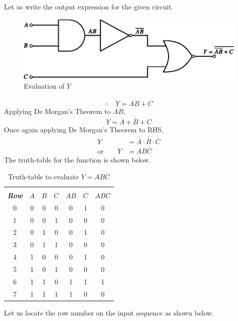 \begin{solution}
Let us write the output expression for the given circuit.
\begin{figure}[H]
\centering
\includegraphics{chap6/fig125.eps}
\medskip
\caption*{Evaluation of $Y$}
\end{figure}

\eject

$$
\therefore\quad Y=\overline{\overline{AB}+C}
$$
Applying De Morgan's Theorem to $\overline{AB}$,
$$
Y=\overline{\overline{A}+\overline{B}+C}
$$
Once again applying De Morgan's Theorem to RHS,
\begin{align*}
Y &= \overline{\overline{A}} \cdot \overline{\overline{B}}\cdot \overline{C}\\[5pt]
\text{or}\qquad Y &= AB\overline{C}
\end{align*}
The truth-table for the function is shown below.
\medskip
\begin{table}[H]
\centering
\tabcolsep=15pt
\renewcommand{\arraystretch}{2}
\begin{tabular}{|c|ccc|ccc|}
\hline
&&&&&&\\[-14pt]
{\bf\em Row} & \boldmath$A$ & \boldmath$B$ & \boldmath$C$ & \boldmath$AB$ & \boldmath$\overline{C}$ & \boldmath$AB\overline{C}$\\
\hline
0 & 0 & 0 & 0 & 0 & 1 & 0\\
1 & 0 & 0 & 1 & 0 & 0 & 0\\
2 & 0 & 1 & 0 & 0 & 1 & 0\\
3 & 0 & 1 & 1 & 0 & 0 & 0\\
4 & 1 & 0 & 0 & 0 & 1 & 0\\
5 & 1 & 0 & 1 & 0 & 0 & 0\\
6 & 1 & 1 & 0 & 1 & 1 & 1\\
7 & 1 & 1 & 1 & 1 & 0 & 0\\
\hline    
\end{tabular}
\caption*{Truth-table to evaluate $Y=AB\overline{C}$}
\end{table}
Let us locate the row number on the input sequence as shown below.
\begin{figure}[H]
\centering

\end{figure}
\end{solution}
